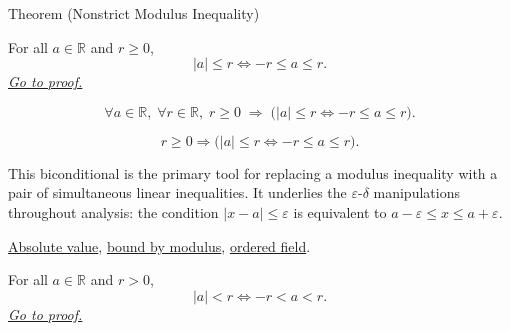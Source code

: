 
\begin{theorembox}{Theorem (Nonstrict Modulus Inequality)}
\begin{theorem}
\label{thm:absolute-value-le-iff}
For all $a \in \mathbb{R}$ and $r \ge 0$,
\[
  \lvert a \rvert \le r \iff -r \le a \le r.
\]
\hyperref[prf:absolute-value-le-iff]{\textit{Go to proof.}}
\end{theorem}
\end{theorembox}



\begin{remark*}
\[
  \forall a \in \mathbb{R},\;
  \forall r \in \mathbb{R},\;
  r \ge 0 \;\Rightarrow\;
  \bigl(\lvert a \rvert \le r \iff -r \le a \le r\bigr).
\]
\end{remark*}

\begin{remark*}
\[
r\ge0\Rightarrow \bigl(|a|\le r\Longleftrightarrow -r\le a\le r\bigr).
\]
\end{remark*}

\begin{remark*}[Interpretation]
This biconditional is the primary tool for replacing a modulus inequality
with a pair of simultaneous linear inequalities.  It underlies the
$\varepsilon$-$\delta$ manipulations throughout analysis: the condition
$\lvert x - a \rvert \le \varepsilon$ is equivalent to
$a - \varepsilon \le x \le a + \varepsilon$.
\end{remark*}

\begin{dependencies}
\hyperref[def:absolute-value]{Absolute value},
\hyperref[thm:absolute-value-bounds]{bound by modulus},
\hyperref[def:real-ordered-field]{ordered field}.
\end{dependencies}


\begin{theorem}
\label{thm:absolute-value-lt-iff}
For all $a \in \mathbb{R}$ and $r > 0$,
\[
  \lvert a \rvert < r \iff -r < a < r.
\]
\hyperref[prf:absolute-value-lt-iff]{\textit{Go to proof.}}
\end{theorem}



